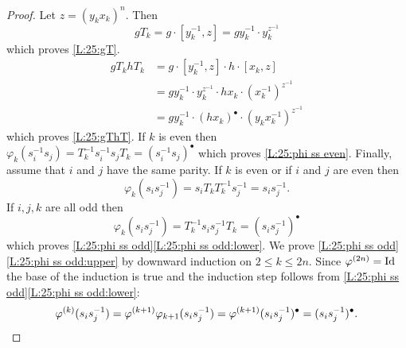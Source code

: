 \documentclass[12pt,reqno,a4paper]{article}
\theoremstyle{definition}
\theoremstyle{remark}
\numberwithin{equation}{section}
\numberwithin{figure}{section}
\begin{document}
\begin{proof}
Let $z = (y_kx_k)^{n}$. Then
$$
gT_k = g\cdot [y_k^{-1},z] = gy_k^{-1}\cdot y_k^{z^{-1}}
$$
which proves \ref{L:25:gT}. %
\begin{align*}
gT_khT_k 
&= g\cdot[y_k^{-1},z]\cdot h\cdot[x_k,z]\\
&= gy_k^{-1}\cdot y_k^{z^{-1}}\cdot hx_k\cdot (x_k^{-1})^{z^{-1}}\\
&= gy_k^{-1}\cdot (hx_k)^{\bullet}\cdot (y_kx_k^{-1})^{z^{-1}}
\end{align*}
which proves \ref{L:25:gThT}. %
If $k$ is even then 
$\varphi_k(s_i^{-1}s_j) = T_k^{-1}s_i^{-1}s_jT_k=(s_i^{-1}s_j)^{\bullet}$ which proves \ref{L:25:phi ss even}.  %
Finally, assume that $i$ and $j$ have the same parity. 
If $k$ is even or if $i$ and $j$ are even then
$$
\varphi_k(s_is_j^{-1}) = s_iT_kT_k^{-1}s_j^{-1}=s_is_j^{-1}.
$$
If $i,j,k$ are all odd then
$$
\varphi_k(s_is_j^{-1}) = T_k^{-1}s_is_j^{-1}T_k = (s_is_j^{-1})^{\bullet}
$$
which proves \ref{L:25:phi ss odd}\ref{L:25:phi ss odd:lower}. 
We prove \ref{L:25:phi ss odd}\ref{L:25:phi ss odd:upper} by downward induction on $2 \leq k \leq 2n$. Since 
$\varphi^{(2n)}={\rm Id}$ the base of the induction is true and the induction
step follows from \ref{L:25:phi ss odd}\ref{L:25:phi ss odd:lower}:
\[
\varphi^{(k)}(s_is_j^{-1})
=\varphi^{(k+1)}\varphi_{k+1}(s_is_j^{-1}) \\
=\varphi^{(k+1)}(s_is_j^{-1})^{\bullet}\\
=(s_is_j^{-1})^{\bullet}.
\]

\end{proof}
\end{document}
